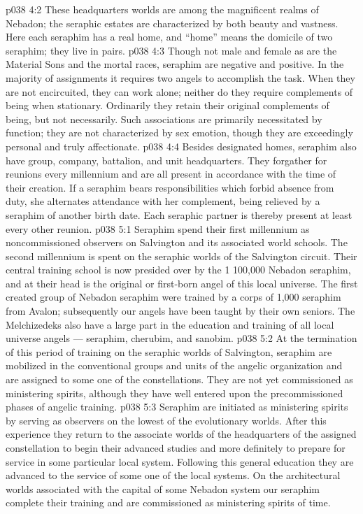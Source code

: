 \vs p038 4:2 These headquarters worlds are among the magnificent realms of Nebadon; the seraphic estates are characterized by both beauty and vastness. Here each seraphim has a real home, and “home” means the domicile of two seraphim; they live in pairs.
\vs p038 4:3 \pc Though not male and female as are the Material Sons and the mortal races, seraphim are negative and positive. In the majority of assignments it requires two angels to accomplish the task. When they are not encircuited, they can work alone; neither do they require complements of being when stationary. Ordinarily they retain their original complements of being, but not necessarily. Such associations are primarily necessitated by function; they are not characterized by sex emotion, though they are exceedingly personal and truly affectionate.
\vs p038 4:4 Besides designated homes, seraphim also have group, company, battalion, and unit headquarters. They forgather for reunions every millennium and are all present in accordance with the time of their creation. If a seraphim bears responsibilities which forbid absence from duty, she alternates attendance with her complement, being relieved by a seraphim of another birth date. Each seraphic partner is thereby present at least every other reunion.
\vs p038 5:1 Seraphim spend their first millennium as noncommissioned observers on Salvington and its associated world schools. The second millennium is spent on the seraphic worlds of the Salvington circuit. Their central training school is now presided over by the 1 100,000 Nebadon seraphim, and at their head is the original or first\hyp{}born angel of this local universe. The first created group of Nebadon seraphim were trained by a corps of 1,000 seraphim from Avalon; subsequently our angels have been taught by their own seniors. The Melchizedeks also have a large part in the education and training of all local universe angels --- seraphim, cherubim, and sanobim.
\vs p038 5:2 At the termination of this period of training on the seraphic worlds of Salvington, seraphim are mobilized in the conventional groups and units of the angelic organization and are assigned to some one of the constellations. They are not yet commissioned as ministering spirits, although they have well entered upon the precommissioned phases of angelic training.
\vs p038 5:3 Seraphim are initiated as ministering spirits by serving as observers on the lowest of the evolutionary worlds. After this experience they return to the associate worlds of the headquarters of the assigned constellation to begin their advanced studies and more definitely to prepare for service in some particular local system. Following this general education they are advanced to the service of some one of the local systems. On the architectural worlds associated with the capital of some Nebadon system our seraphim complete their training and are commissioned as ministering spirits of time.
